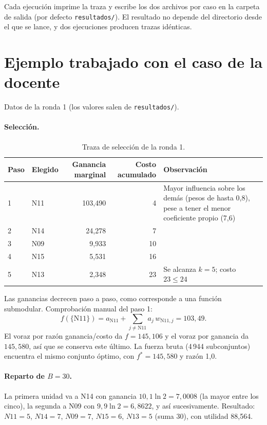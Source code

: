 \documentclass[11pt,a4paper]{article}
\begin{document}
Cada ejecución imprime la traza y escribe los dos archivos por caso en la
carpeta de salida (por defecto \texttt{resultados/}). El resultado no depende
del directorio desde el que se lance, y dos ejecuciones producen trazas
idénticas.

\section{Ejemplo trabajado con el caso de la docente}

Datos de la ronda 1 (los valores salen de \texttt{resultados/}).

\paragraph{Selección.}

\begin{table}[htbp]
\centering
\small
\renewcommand{\arraystretch}{1.2}
\begin{tabularx}{\textwidth}{@{}l l r r >{\raggedright\arraybackslash}X@{}}
\toprule
Paso & Elegido & Ganancia marginal & Costo acumulado & Observación \\
\midrule
1 & N11 & 103,490 & 4  & Mayor influencia sobre los demás (pesos de hasta
0,8), pese a tener el menor coeficiente propio (7,6) \\
2 & N14 & 24,278  & 7  & \\
3 & N09 & 9,933   & 10 & \\
4 & N15 & 5,531   & 16 & \\
5 & N13 & 2,348   & 23 & Se alcanza $k=5$; costo $23\le24$ \\
\bottomrule
\end{tabularx}
\caption{Traza de selección de la ronda 1.}
\end{table}

Las ganancias decrecen paso a paso, como corresponde a una función submodular.
Comprobación manual del paso 1:
\[
  f(\{\text{N11}\})
  = a_{\text{N11}}+\sum_{j\ne\text{N11}} a_j\,w_{\text{N11},j}
  =103{,}49.
\]
El voraz por razón ganancia/costo da $f=145{,}106$ y el voraz por ganancia da
$145{,}580$, así que se conserva este último. La fuerza bruta (4\,944
subconjuntos) encuentra el mismo conjunto óptimo, con $f^*=145{,}580$ y razón
1,0.

\paragraph{Reparto de $B=30$.} La primera unidad va a N14 con ganancia
$10{,}1\ln2=7{,}0008$ (la mayor entre los cinco), la segunda a N09 con
$9{,}9\ln2=6{,}8622$, y así sucesivamente. Resultado: $N11=5$, $N14=7$,
$N09=7$, $N15=6$, $N13=5$ (suma 30), con utilidad 88,564.
\end{document}
